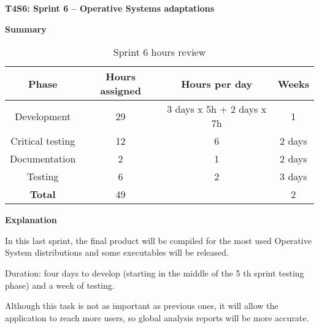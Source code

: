 \textbf{T4S6: Sprint 6 – Operative Systems adaptations}

\textbf{Summary}
\begin{table}[ht]
\centering
  \begin{tabular}{| c | c | c | c |}
  \hline Phase & Hours assigned & Hours per day & Weeks \\ \hline  
  Development & 29 & 3 days x 5h + 2 days x 7h & 1        \\ \hline
  Critical testing & 12 & 6 & 2 days       \\ \hline
  Documentation & 2 & 1 & 2 days        \\ \hline
  Testing & 6 & 2 & 3 days        \\ \hline \hline   
  \textbf{Total} & 49 &  & 2  \\ \hline
  \end{tabular}
  \caption{Sprint 6 hours review} \vspace{3pt}
  \label{tab:sprint6}
\end{table}


\textbf{Explanation}

In this last sprint, the final product will be compiled for the most used Operative System distributions and some executables will be released.

Duration: four days to develop (starting in the middle of the 5 th sprint testing phase) and a week of testing.

Although this task is not as important as previous ones, it will allow the application to reach more users, so global analysis reports will be more accurate.
